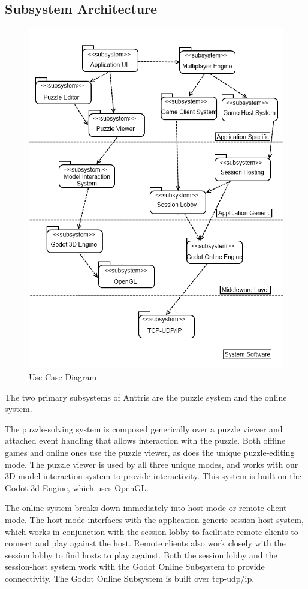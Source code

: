 \documentclass[12pt]{article}
\begin{document}
\subsection{Subsystem Architecture}
\begin{figure}[H]
    \centering
    \includegraphics[width=6in]{subsys_arch.png}
    \caption{Use Case Diagram}
\end{figure}
The two primary subsystems of Anttris are the puzzle system and the online system.

The puzzle-solving system is composed generically over a puzzle viewer and attached event
handling that allows interaction with the puzzle. Both offline games and online ones use 
the puzzle viewer, as does the unique puzzle-editing mode. The puzzle viewer is used by
all three unique modes, and works with our 3D model interaction system to provide
interactivity. This system is built on the Godot 3d Engine, which uses OpenGL.

The online system breaks down immediately into host mode or remote client mode. The host 
mode interfaces with the application-generic session-host system, which works in conjunction
with the session lobby to facilitate remote clients to connect and play against the host. 
Remote clients also work closely with the session lobby to find hosts to play against. Both
the session lobby and the session-host system work with the Godot Online Subsystem to provide
connectivity. The Godot Online Subsystem is built over tcp-udp/ip.
\end{document}
